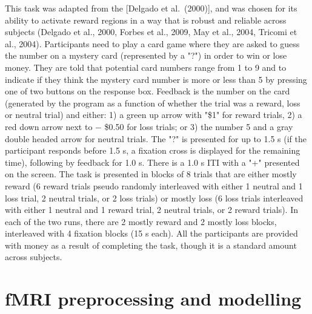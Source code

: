 \documentclass[11pt]{article}
\begin{document}
This task was adapted from the {[}Delgado et al.~(2000){]}, and was
chosen for its ability to activate reward regions in a way that is
robust and reliable across subjects (Delgado et al., 2000, Forbes et
al., 2009, May et al., 2004, Tricomi et al., 2004). Participants need to
play a card game where they are asked to guess the number on a mystery
card (represented by a "?") in order to win or lose money. They are told
that potential card numbers range from 1 to 9 and to indicate if they
think the mystery card number is more or less than 5 by pressing one of
two buttons on the response box. Feedback is the number on the card
(generated by the program as a function of whether the trial was a
reward, loss or neutral trial) and either: 1) a green up arrow with
"\$1" for reward trials, 2) a red down arrow next to − \$0.50 for loss
trials; or 3) the number 5 and a gray double headed arrow for neutral
trials. The "?" is presented for up to 1.5 s (if the participant
responds before 1.5 s, a fixation cross is displayed for the remaining
time), following by feedback for 1.0 s. There is a 1.0 s ITI with a "+"
presented on the screen. The task is presented in blocks of 8 trials
that are either mostly reward (6 reward trials pseudo randomly
interleaved with either 1 neutral and 1 loss trial, 2 neutral trials, or
2 loss trials) or mostly loss (6 loss trials interleaved with either 1
neutral and 1 reward trial, 2 neutral trials, or 2 reward trials). In
each of the two runs, there are 2 mostly reward and 2 mostly loss
blocks, interleaved with 4 fixation blocks (15 s each). All the
participants are provided with money as a result of completing the task,
though it is a standard amount across subjects.

\section{fMRI preprocessing and modelling}
\end{document}
